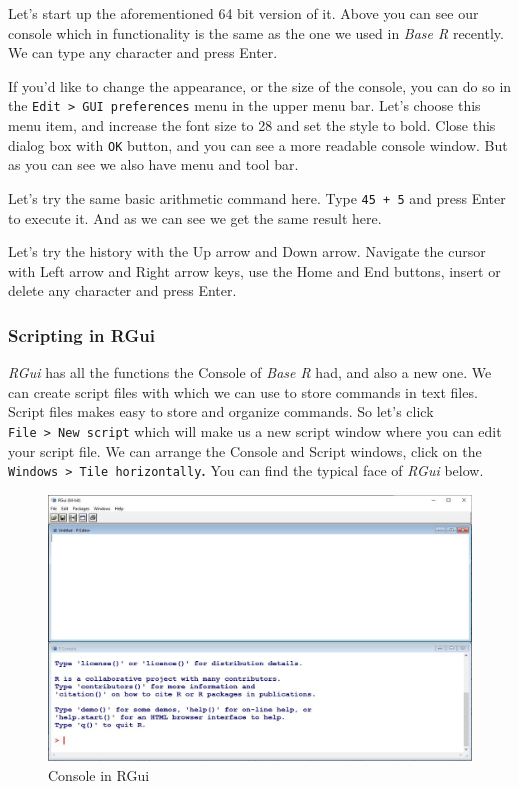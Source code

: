 \documentclass[
]{book}
\begin{document}
Let's start up the aforementioned 64 bit version of it. Above you can
see our console which in functionality is the same as the one we used in
\emph{Base R} recently. We can type any character and press Enter.

If you'd like to change the appearance, or the size of the console, you
can do so in the \texttt{Edit\ \textgreater{}\ GUI\ preferences} menu in the upper menu bar.
Let's choose this menu item, and increase the font size to 28 and set
the style to bold. Close this dialog box with \texttt{OK} button, and you can
see a more readable console window. But as you can see we also have menu
and tool bar.

Let's try the same basic arithmetic command here. Type \texttt{45\ +\ 5} and
press Enter to execute it. And as we can see we get the same
result here.

Let's try the history with the Up arrow and Down
arrow. Navigate the cursor with Left arrow and
Right arrow keys, use the Home and End
buttons, insert or delete any character and press Enter.

\hypertarget{scripting-in-rgui}{%
\subsubsection{Scripting in RGui}\label{scripting-in-rgui}}

\emph{RGui} has all the functions the Console of \emph{Base R} had, and also a new
one. We can create script files with which we can use to store commands
in text files. Script files makes easy to store and organize commands.
So let's click \texttt{File\ \textgreater{}\ New\ script} which will make us a new script
window where you can edit your script file. We can arrange the Console
and Script windows, click on the \texttt{Windows\ \textgreater{}\ Tile\ horizontally}\textbf{.} You
can find the typical face of \emph{RGui} below.

\begin{figure}

{\centering \includegraphics[width=0.7\linewidth]{img/rgui_script} 

}

\caption{Console in RGui}\label{fig:unnamed-chunk-13}
\end{figure}
\end{document}
